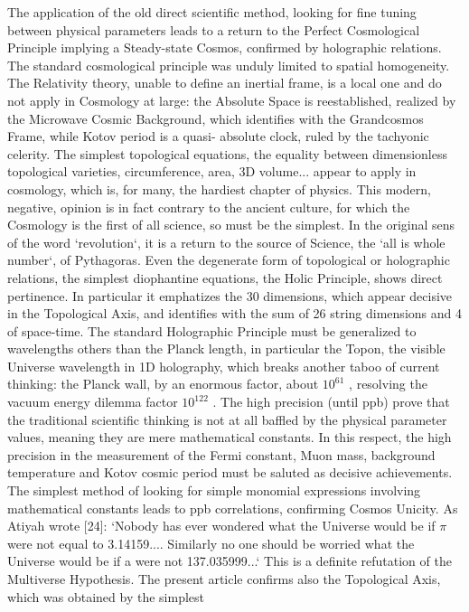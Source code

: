 \documentclass[twoside,draft]{article}
\begin{document}
\begin{sloppypar}
{The application of the old direct scientific method, looking for fine tuning between physical
parameters leads to a return to the Perfect Cosmological Principle implying a Steady-state Cosmos,
confirmed by holographic relations. The standard cosmological principle was unduly limited to
spatial homogeneity. The Relativity theory, unable to define an inertial frame, is a local one and do
not apply in Cosmology at large: the Absolute Space is reestablished, realized by the Microwave
Cosmic Background, which identifies with the Grandcosmos Frame, while Kotov period is a quasi-
absolute clock, ruled by the tachyonic celerity.
The simplest topological equations, the equality between dimensionless topological varieties,
circumference, area, 3D volume... appear to apply in cosmology, which is, for many, the hardiest
chapter of physics. This modern, negative, opinion is in fact contrary to the ancient culture, for
which the Cosmology is the first of all science, so must be the simplest. In the original sens of the
word `revolution`, it is a return to the source of Science, the `all is whole number`, of Pythagoras.
Even the degenerate form of topological or holographic relations, the simplest diophantine
equations, the Holic Principle, shows direct pertinence. In particular it emphatizes the 30
dimensions, which appear decisive in the Topological Axis, and identifies with the sum of 26 string
dimensions and 4 of space-time.
The standard Holographic Principle must be generalized to wavelengths others than the Planck
length, in particular the Topon, the visible Universe wavelength in 1D holography, which breaks
another taboo of current thinking: the Planck wall, by an enormous factor, about $10^{61}$ , resolving the
vacuum energy dilemma factor $10^{122}$ .
The high precision (until ppb) prove that the traditional scientific thinking is not at all baffled by
the physical parameter values, meaning they are mere mathematical constants. In this respect, the
high precision in the measurement of the Fermi constant, Muon mass, background temperature and
Kotov cosmic period must be saluted as decisive achievements.
The simplest method of looking for simple monomial expressions involving mathematical
constants leads to ppb correlations, confirming Cosmos Unicity. As Atiyah wrote [24]: `Nobody has
ever wondered what the Universe would be if $\pi$ were not equal to 3.14159.... Similarly no one
should be worried what the Universe would be if a were not 137.035999...` This is a definite
refutation of the Multiverse Hypothesis.
The present article confirms also the Topological Axis, which was obtained by the simplest
}
\end{sloppypar}
\end{document}

